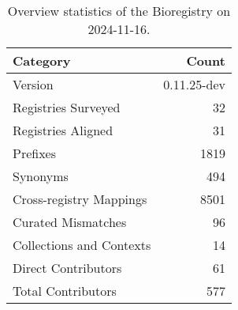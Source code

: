 \begin{table}
\caption{Overview statistics of the Bioregistry on 2024-11-16.}
\label{tab:bioregistry-summary}
\begin{tabular}{lr}
\toprule
Category & Count \\
\midrule
Version & 0.11.25-dev \\
Registries Surveyed & 32 \\
Registries Aligned & 31 \\
Prefixes & 1819 \\
Synonyms & 494 \\
Cross-registry Mappings & 8501 \\
Curated Mismatches & 96 \\
Collections and Contexts & 14 \\
Direct Contributors & 61 \\
Total Contributors & 577 \\
\bottomrule
\end{tabular}
\end{table}
